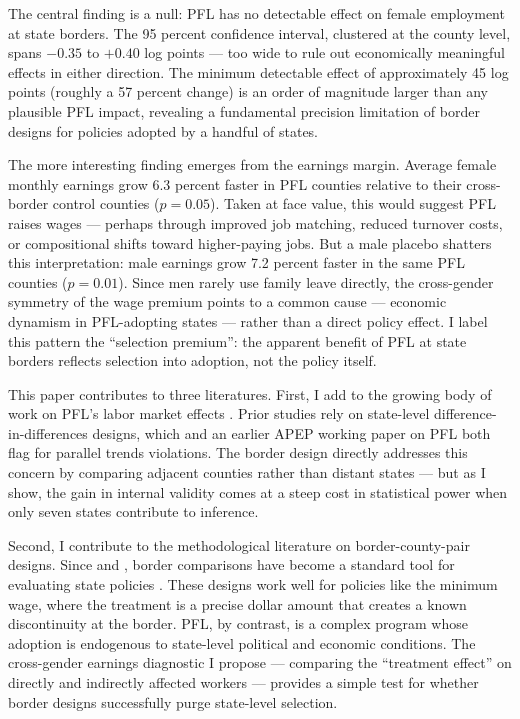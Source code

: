 \documentclass[12pt]{article}
\begin{document}
The central finding is a null: PFL has no detectable effect on female employment at state borders. The 95 percent confidence interval, clustered at the county level, spans $-0.35$ to $+0.40$ log points --- too wide to rule out economically meaningful effects in either direction. The minimum detectable effect of approximately 45 log points (roughly a 57 percent change) is an order of magnitude larger than any plausible PFL impact, revealing a fundamental precision limitation of border designs for policies adopted by a handful of states.

The more interesting finding emerges from the earnings margin. Average female monthly earnings grow 6.3 percent faster in PFL counties relative to their cross-border control counties ($p = 0.05$). Taken at face value, this would suggest PFL raises wages --- perhaps through improved job matching, reduced turnover costs, or compositional shifts toward higher-paying jobs. But a male placebo shatters this interpretation: male earnings grow 7.2 percent faster in the same PFL counties ($p = 0.01$). Since men rarely use family leave directly, the cross-gender symmetry of the wage premium points to a common cause --- economic dynamism in PFL-adopting states --- rather than a direct policy effect. I label this pattern the ``selection premium'': the apparent benefit of PFL at state borders reflects selection into adoption, not the policy itself.

This paper contributes to three literatures. First, I add to the growing body of work on PFL's labor market effects \citep{rossin-slater_effects_2013, baum_effect_2016, byker_paid_2016, stearns_unintended_2018, bana_unequal_2020}. Prior studies rely on state-level difference-in-differences designs, which \citet{bailey_paid_2023} and an earlier APEP working paper on PFL both flag for parallel trends violations. The border design directly addresses this concern by comparing adjacent counties rather than distant states --- but as I show, the gain in internal validity comes at a steep cost in statistical power when only seven states contribute to inference.

Second, I contribute to the methodological literature on border-county-pair designs. Since \citet{holmes_effect_1998} and \citet{dube_minimum_2010}, border comparisons have become a standard tool for evaluating state policies \citep{hagedorn_unemployment_2015, cengiz_effect_2019}. These designs work well for policies like the minimum wage, where the treatment is a precise dollar amount that creates a known discontinuity at the border. PFL, by contrast, is a complex program whose adoption is endogenous to state-level political and economic conditions. The cross-gender earnings diagnostic I propose --- comparing the ``treatment effect'' on directly and indirectly affected workers --- provides a simple test for whether border designs successfully purge state-level selection.
\end{document}
